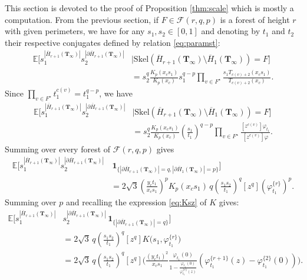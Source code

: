 \documentclass[AHL,XML,longabstracts,Unicode,NoSaveZebib]{cedram}
\begin{document}
This section is devoted to the proof of Proposition \ref{thm:scale} which is mostly a computation.
From the previous section, if $F \in \mathcal{F}(r,q,p)$ is a forest of height $r$ with given perimeters, we have for any $s_1,s_2 \in [0,1]$ and denoting by $t_1$ and $t_2$ their respective conjugates defined by relation \eqref{eq:paramst}:
\begin{align*}
\mathbb E \Big[
s_1^{|\overline{H}_{r+1} ( \mathbf{T}_{\infty})|} s_2^{|\partial \overline{H}_{r+1} (\mathbf{T}_{\infty})|}
& \Big| \mathrm{Skel} \left( \overline{H}_{r+1} (\mathbf{T}_{\infty}) \setminus \overline{H}_{1} (\mathbf{T}_{\infty})  \right) = F
\Big] \\
& = s_2^q \frac{K_p(x_c s_1)}{K_p (x_c)} s_1^{q-p} \prod_{v \in F^\star} \frac{s_1 T_{c(v) + 2}(x_c s_1)}{T_{c(v) + 2}(x_c)}.
\end{align*}
Since $\prod_{v \in F^\star} t_1^{c(v)} = t_1^{q-p}$, we have
\begin{align*}
\mathbb E \Big[
s_1^{|\overline{H}_{r+1} (\mathbf{T}_{\infty})|} s_2^{|\partial \overline{H}_{r+1} (\mathbf{T}_{\infty})|}
& \Big| \mathrm{Skel} \left( \overline{H}_{r+1} (\mathbf{T}_{\infty}) \setminus \overline{H}_{1} (\mathbf{T}_{\infty})  \right) = F
\Big]\\
& = s_2^q \frac{K_p(x_c s_1)}{K_p (x_c)} \left( \frac{s_1}{t_1}\right)^{q-p}\prod_{v \in F^\star} \frac{[z^{c(v)}] \varphi_{t_1}}{[z^{c(v)}] \varphi}.
\end{align*}
Summing over every forest of $\mathcal{F}(r,q,p)$ gives
\begin{align*}
\mathbb E \Big[
s_1^{|\overline{H}_{r+1} (\mathbf{T}_{\infty})|} s_2^{|\partial \overline{H}_{r+1} (\mathbf{T}_{\infty})|}
& \, \mathbf{1}_
{ \{ |\partial \overline{H}_{r+1} (\mathbf{T}_{\infty})| = q , |\partial \overline{H}_{1} (\mathbf{T}_{\infty})| = p \} }
\Big]\\
& = 2 \sqrt{3} \left( \frac{y_c t_1}{x_c s_1}\right)^{p}
K_p(x_c s_1) \,
q \left( \frac{s_1 s_2}{t_1}\right)^{q}[z^q] \left( \varphi_{t_1}^{\{r\}} \right)^p.
\end{align*}
Summing over $p$ and recalling the expression \eqref{eq:Ksz} of $K$ gives:
\begin{align*}
\mathbb E \Big[
s_1^{|\overline{H}_{r+1} (\mathbf{T}_{\infty})|} & s_2^{|\partial \overline{H}_{r+1} (\mathbf{T}_{\infty})|}
\, \mathbf{1}_
{ \{ |\partial \overline{H}_{r+1} (\mathbf{T}_{\infty})| = q \} }
\Big]\\
& = 2 \sqrt{3} \,
q \left( \frac{s_1 s_2}{t_1}\right)^{q}[z^q] K \big( s_1,\varphi_{t_1}^{\{r\}}  \big)\\
& = 2 \sqrt{3} \,
q \left( \frac{s_1 s_2}{t_1}\right)^{q}[z^q]
\Bigg(
\frac{(y_c {t_1})^2}{x_c {s_1}} \frac{\varphi_{t_1} (0)}{1 - \frac{\varphi_{t_1} (0)}{\varphi_{t_1}^{\{r\}}(z)}} \left(\varphi_{t_1}^{\{r+1\}} (z)- \varphi^{\{2\}}_{t_1}(0) \right)
\Bigg).
\end{align*}
\end{document}
